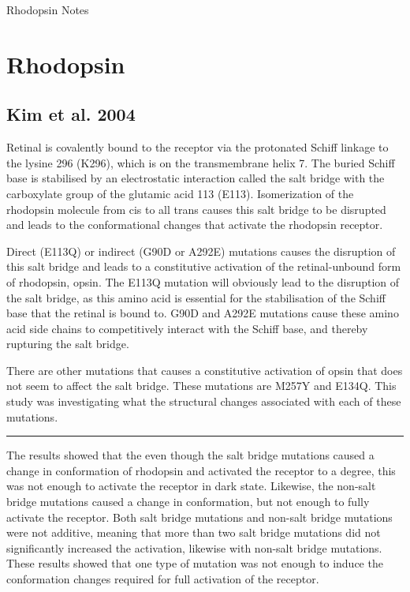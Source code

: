 \documentclass[a4paper,12pt]{article}
\begin{document}
\begin{center}
\LARGE{Rhodopsin Notes}
\end{center}

\section*{Rhodopsin}

\subsection*{\normalsize{Kim et al. 2004}}

Retinal is covalently bound to the receptor via the protonated Schiff linkage to the lysine 296 (K296), which is on the transmembrane helix 7.
The buried Schiff base is stabilised by an electrostatic interaction called the salt bridge with the carboxylate group of the glutamic acid 113 (E113).
Isomerization of the rhodopsin molecule from cis to all trans causes this salt bridge to be disrupted and leads to the conformational changes that activate the rhodopsin receptor.

Direct (E113Q) or indirect (G90D or A292E) mutations causes the disruption of this salt bridge and leads to a constitutive activation of the retinal-unbound form of rhodopsin, opsin.
The E113Q mutation will obviously lead to the disruption of the salt bridge, as this amino acid is essential for the stabilisation of the Schiff base that the retinal is bound to.
G90D and A292E mutations cause these amino acid side chains to competitively interact with the Schiff base, and thereby rupturing the salt bridge.

There are other mutations that causes a constitutive activation of opsin that does not seem to affect the salt bridge.
These mutations are M257Y and E134Q.
This study was investigating what the structural changes associated with each of these mutations.

\noindent\rule{\textwidth}{0.4pt}

The results showed that the even though the salt bridge mutations caused a change in conformation of rhodopsin and activated the receptor to a degree, this was not enough to activate the receptor in dark state.
Likewise, the non-salt bridge mutations caused a change in conformation, but not enough to fully activate the receptor.
Both salt bridge mutations and non-salt bridge mutations were not additive, meaning that more than two salt bridge mutations did not significantly increased the activation, likewise with non-salt bridge mutations.
These results showed that one type of mutation was not enough to induce the conformation changes required for full activation of the receptor.
\end{document}

